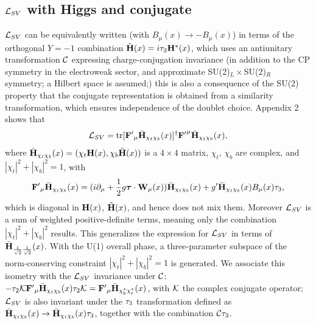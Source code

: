 \documentclass[12pt]{article}
\renewcommand\[{\begin{dmath}}
\renewcommand\]{\end{dmath}}
\newcommand{\boldmathtau}{\mbox{\boldmath$\tau$\unboldmath}}
\begin{document}
\subsection{${\cal L}_{SV}$ with Higgs and conjugate }
 ${\cal L}_{SV}$ can be equivalently written   (with $B_\mu(x)\rightarrow -B_\mu(x)$)  in terms of  the orthogonal  $Y=-1$ combination   $\tilde{\bf H}(x)=i \tau_2 {\bf H}^*(x)$,  which uses an antiunitary  transformation ${\cal C}$  expressing charge-conjugation invariance   (in addition to the  CP symmetry in the electroweak sector, and approximate SU(2)$_L\times $SU(2)$_R$ symmetry\cite{Weinstein}; a Hilbert space is assumed;)    this is also a consequence of the    SU(2)  property that the conjugate representation is obtained from a similarity transformation, which
  ensures independence of the doublet choice.
   Appendix 2 shows that
 \begin{eqnarray}\label{LSVHiggsAndScalar} {\cal L}_{SV}= {\rm tr}{[ {\bf F'}_\mu  \bar{\bf H}_{\chi_t   \chi_b}(x)}]^\dagger {\bf F'}^\mu \bar{\bf H}_{\chi_t   \chi_b}(x),  \end{eqnarray}  where
  $\bar{\bf H}_{ \chi_t    \chi_b }(x)=(\chi_t  {\bf H}(x),\chi_b \tilde{\bf H}(x))$  is a $4 \times 4$
matrix, $\chi_t$, $\chi_b$ are
 complex, and $|\chi_t|^2+|\chi_b|^2=1$,
  with
  \begin{eqnarray}\label{Fp}{\bf F'}_\mu \bar{\bf H}_{\chi_t   \chi_b }(x) =
 (i \partial_\mu+\frac{1}{2}g  {\boldmathtau}\cdot {\bf W_\mu}(x)) \bar{\bf H}_{\chi_t   \chi_b }(x) +
g'\bar{\bf H}_{\chi_t   \chi_b }(x) B_\mu(x)\tau_3,\end{eqnarray}
  which is diagonal in   $ {\bf H}(x)$,  $\tilde{\bf H}(x)$, and hence does not mix them. Moreover ${\cal L}_{SV}$ is a sum of weighted positive-definite terms, meaning only the combination $|\chi_t|^2+|\chi_b|^2$ results.   This generalizes the expression\cite{Sikivie,Chivukula}  for ${\cal L}_{SV}$ in terms of
  $\bar {\bf H}_{ \frac{1}{\sqrt{2}} \frac{1}{\sqrt{2}}}(x) $.  With the U(1) overall phase, a three-parameter subspace of the norm-conserving constraint $|\chi_t|^2+|\chi_b|^2=1$ is generated. We associate this isometry with the   ${\cal L}_{SV}$  invariance under ${\cal C}$:  $ -\tau_2{\cal K} {\bf F'}_\mu \bar{\bf H}_{\chi_t   \chi_b }(x) \tau_2{\cal K}=
  {\bf F'}_\mu \bar{\bf H}_{\chi_b^*\chi_t^*}(x)$, with ${\cal K}$ the complex conjugate operator;
     ${\cal L}_{SV}$ is also invariant under the  ${\cal \tau}_3$  transformation defined as
   $\bar{\bf H}_{\chi_t   \chi_b}(x) \rightarrow \bar{\bf H}_{\chi_t   \chi_b}(x) \tau_3 $,   together with the combination     ${\cal C}\tau_3$.
\end{document}
